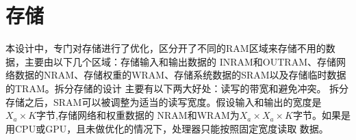 \section{存储}
本设计中，专门对存储进行了优化，区分开了不同的RAM区域来存储不用的数据，主要由以下几个区域：存储输入和输出数据的
INRAM和OUTRAM、存储网络数据的NRAM、存储权重的WRAM、存储系统数据的SRAM以及存储临时数据的TRAM。拆分存储的设计
主要有以下两大好处：读写的带宽和避免冲突。
拆分存储之后，SRAM可以被调整为适当的读写宽度。假设输入和输出的宽度是$X_a \times K$字节,存储网络和权重数据的
NRAM和WRAM为$X_a \times X_a \times K$字节。如果是用CPU或GPU，且未做优化的情况下，处理器只能按照固定宽度读取
数据。
